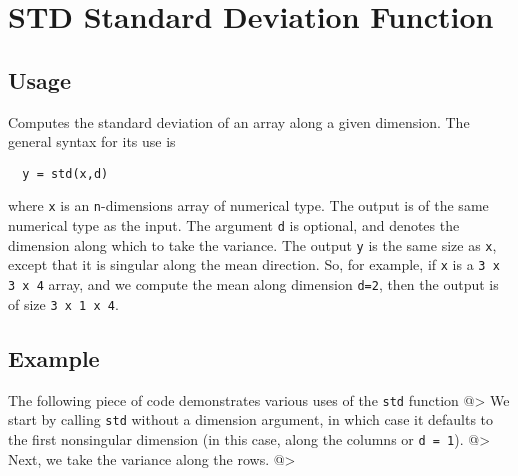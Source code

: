 \section{STD Standard Deviation Function}

\subsection{Usage}

Computes the standard deviation of an array along a given dimension.  
The general syntax for its use is
\begin{verbatim}
  y = std(x,d)
\end{verbatim}
where \verb|x| is an \verb|n|-dimensions array of numerical type.
The output is of the same numerical type as the input.  The argument
\verb|d| is optional, and denotes the dimension along which to take
the variance.  The output \verb|y| is the same size as \verb|x|, except
that it is singular along the mean direction.  So, for example,
if \verb|x| is a \verb|3 x 3 x 4| array, and we compute the mean along
dimension \verb|d=2|, then the output is of size \verb|3 x 1 x 4|.
\subsection{Example}

The following piece of code demonstrates various uses of the \verb|std|
function
@>
We start by calling \verb|std| without a dimension argument, in which 
case it defaults to the first nonsingular dimension (in this case, 
along the columns or \verb|d = 1|).
@>
Next, we take the variance along the rows.
@>
